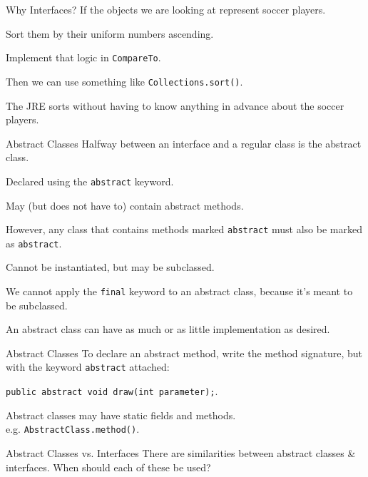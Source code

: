 \documentclass{beamer}
\begin{document}
\begin{frame}{Why Interfaces?}
 If the objects we are looking at represent soccer players. 
 
 Sort them by their uniform numbers ascending. 
 
 Implement that logic in \texttt{CompareTo}. 
 
 Then we can use something like \texttt{Collections.sort()}. 
 
 The JRE sorts without having to know anything in advance about the soccer players.
\end{frame}





\begin{frame}{Abstract Classes}
Halfway between an interface and a regular class is the \alert{abstract class}. 

Declared using the \texttt{abstract} keyword. 

May (but does not have to) contain abstract methods. 

However, any class that contains methods marked \texttt{abstract} must also be marked as \texttt{abstract}. 

Cannot be instantiated, but may be subclassed. 

We cannot apply the \texttt{final} keyword to an abstract class, because it's meant to be subclassed.

An abstract class can have as much or as little implementation as desired.
\end{frame}





\begin{frame}[fragile]{Abstract Classes}
To declare an abstract method, write the method signature, but with the keyword \texttt{abstract} attached: 

\verb+public abstract void draw(int parameter);+.

Abstract classes may have static fields and methods.\\
\quad e.g. \texttt{AbstractClass.method()}.
\end{frame}




\begin{frame}{Abstract Classes vs. Interfaces}
There are similarities between abstract classes \& interfaces.
When should each of these be used?
\end{frame}
\end{document}
